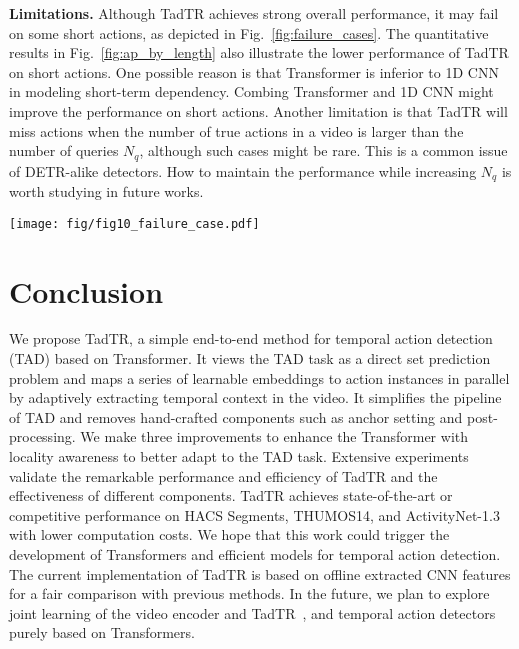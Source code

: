 \documentclass[lettersize,journal]{IEEEtran}
\begin{document}
\vspace{1ex}\noindent\textbf{Limitations.} 
Although TadTR achieves strong overall performance, it may fail on some short actions, as depicted in Fig.~\ref{fig:failure_cases}. The quantitative results in Fig.~\ref{fig:ap_by_length} also illustrate the lower performance of TadTR on short actions. One possible reason is that Transformer is inferior to 1D CNN in modeling short-term dependency. Combing Transformer and 1D CNN might improve the performance on short actions. Another limitation is that TadTR will miss actions when the number of true  actions in a video is larger than the number of queries $N_q$, although such cases might be rare. This is a common issue of DETR-alike detectors. How to maintain the performance while increasing $N_q$ is worth studying in future works.


\begin{figure*}[t]
\centering
\texttt{[image: fig/fig10\_failure\_case.pdf]}
\caption{Failure cases. TadTR misses the two short actions that are hard to detect while the 1D CNN-based method MUSES partially detects them.
}
\label{fig:failure_cases}
\end{figure*}


\section{Conclusion}
We propose TadTR, a simple end-to-end method for temporal action detection (TAD) based on Transformer. It views the TAD task as a direct set prediction problem and maps a series of learnable embeddings to action instances in parallel by adaptively extracting temporal context in the video.
It simplifies the pipeline of TAD and removes hand-crafted components such as anchor setting and post-processing. We make three improvements to enhance the Transformer with locality awareness to better adapt to the TAD task.
Extensive experiments validate the remarkable performance and efficiency of TadTR and the effectiveness of different components. TadTR achieves state-of-the-art or competitive performance on HACS Segments, THUMOS14, and ActivityNet-1.3 with lower computation costs. 
We hope that this work could trigger the development of Transformers and efficient models for temporal action detection.
The current implementation of TadTR is based on offline extracted CNN features for a fair comparison with previous methods. In the future, we plan to explore joint learning of the video encoder and TadTR~\cite{Liu_2022_CVPR}, and temporal action detectors purely based on Transformers.   
\end{document}
